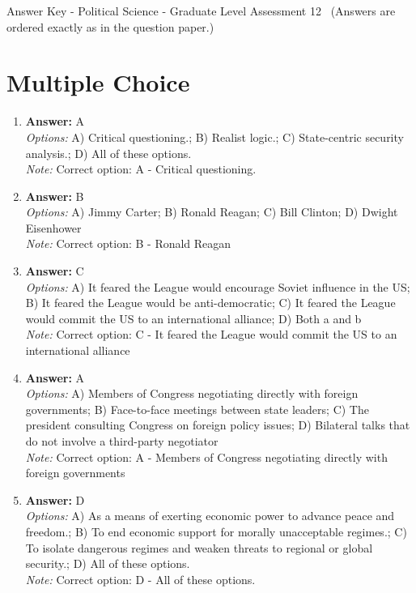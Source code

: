 \documentclass[12pt]{article}
\begin{document}
\begin{center}
Answer Key - Political Science - Graduate Level Assessment 12 \
\small (Answers are ordered exactly as in the question paper.)
\end{center}

\section*{Multiple Choice}
\begin{enumerate}[label=\arabic*.]
\item \textbf{Answer:} A
\\ \textit{Options:} A) Critical questioning.; B) Realist logic.; C) State-centric security analysis.; D) All of these options.
\\ \textit{Note:} Correct option: A - Critical questioning.
\item \textbf{Answer:} B
\\ \textit{Options:} A) Jimmy Carter; B) Ronald Reagan; C) Bill Clinton; D) Dwight Eisenhower
\\ \textit{Note:} Correct option: B - Ronald Reagan
\item \textbf{Answer:} C
\\ \textit{Options:} A) It feared the League would encourage Soviet influence in the US; B) It feared the League would be anti-democratic; C) It feared the League would commit the US to an international alliance; D) Both a and b
\\ \textit{Note:} Correct option: C - It feared the League would commit the US to an international alliance
\item \textbf{Answer:} A
\\ \textit{Options:} A) Members of Congress negotiating directly with foreign governments; B) Face-to-face meetings between state leaders; C) The president consulting Congress on foreign policy issues; D) Bilateral talks that do not involve a third-party negotiator
\\ \textit{Note:} Correct option: A - Members of Congress negotiating directly with foreign governments
\item \textbf{Answer:} D
\\ \textit{Options:} A) As a means of exerting economic power to advance peace and freedom.; B) To end economic support for morally unacceptable regimes.; C) To isolate dangerous regimes and weaken threats to regional or global security.; D) All of these options.
\\ \textit{Note:} Correct option: D - All of these options.
\end{enumerate}
\end{document}
